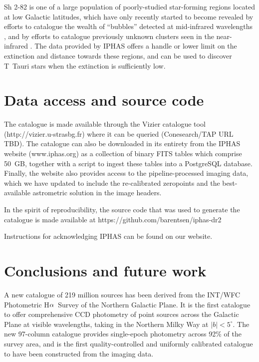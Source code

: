 \documentclass[useAMS,usenatbib]{mn2e}
\def\ha{\mbox{H$\rm \alpha$}}
\begin{document}
Sh 2-82 is one of a large population of poorly-studied star-forming regions
located at low Galactic latitudes,
which have only recently started to become revealed
by efforts to catalogue the wealth of ``bubbles'' detected
at mid-infrared wavelengths \citep{Churchwell2006,Simpson2012},
and by efforts to catalogue previously unknown clusters seen 
in the near-infrared \cite[e.g.][]{Bica2003}.
The data provided by IPHAS offers a handle
or lower limit on the extinction and distance
towards these regions,
and can be used to discover T~Tauri stars
when the extinction is sufficiently low.

\section{Data access and source code}
\label{sec:dataaccess}

The catalogue is made available through the Vizier
catalogue tool (http://vizier.u-strasbg.fr)
where it can be queried
(Conesearch/TAP URL TBD).
The catalogue can also be downloaded in its entirety
from the IPHAS website (www.iphas.org) as a collection 
of binary FITS tables which comprise 50~GB,
together with a script
to ingest these tables into a PostgreSQL database.
Finally, the website also provides access to the pipeline-processed
imaging data, which we have updated to include
the re-calibrated zeropoints and the best-available
astrometric solution in the image headers.

In the spirit of reproducibility,
the source code that was used to generate
the catalogue is made available at
https://github.com/barentsen/iphas-dr2

Instructions for acknowledging IPHAS can be found on our website.


\section{Conclusions and future work}
\label{sec:conclusions}

A new catalogue of 219 million sources has been
derived from the INT/WFC Photometric \ha\ Survey
of the Northern Galactic Plane.
It is the first catalogue to offer comprehensive CCD photometry
of point sources across the Galactic Plane at visible wavelengths,
taking in the Northern Milky Way at $|b|<5^\circ$.
The new 97-column catalogue provides single-epoch photometry
across 92\% of the survey area,
and is the first quality-controlled and uniformly calibrated
catalogue to have been constructed from the imaging data.
\end{document}
